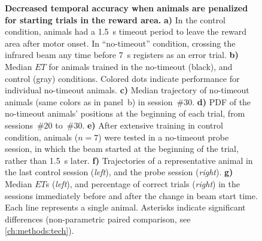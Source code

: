  \begin{figure}[bt!]
  \begin{center}
    \caption[No-Timeout Condition]
    {\textbf{Decreased temporal accuracy when animals are penalized for starting trials in the reward area.}
    \textbf{a)}
    In the control condition, animals had a 1.5~s timeout period to leave the reward area after motor onset.
    In ``no-timeout'' condition, crossing the infrared beam any time before 7~s registers as an error trial.
    \textbf{b)}
    Median $ET$ for animals trained in the no-timeout (black), and control (gray) conditions.
    Colored dots indicate performance for individual no-timeout animals.
    \textbf{c)}
    Median trajectory of no-timeout animals (same colors as in panel~b) in session~\#30.
    \textbf{d)}
    PDF of the no-timeout animals' positions at the beginning of each trial, from sessions~\#20 to~\#30.
    \textbf{e)}
    After extensive training in control condition, animals ($n=7$) were tested in a no-timeout probe session, in which the beam started at the beginning of the trial, rather than 1.5~s later.
    \textbf{f)}
    Trajectories of a representative animal in the last control session (\textit{left}), and the probe session (\textit{right}).
    \textbf{g)}
    Median $ET$s (\textit{left}), and percentage of correct trials (\textit{right}) in the sessions immediately before and after the change in beam start time.
    Each line represents a single animal.
    Asterisks indicate significant differences (non-parametric paired comparison, see \autoref{ch:methods:tech}).
    }
    \label{fig:time:ntoTrd}
  \end{center}
\end{figure}
